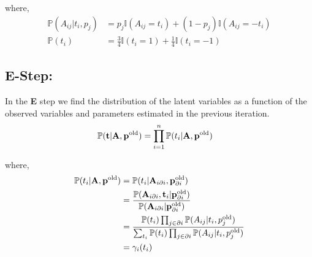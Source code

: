 \documentclass[12pt,onecolumn,letterpaper]{article}
\begin{document}
\noindent
where,
\begin{align*}
\mathbb{P}(A_{ij}|t_i,p_j) &= p_j\mathbb{I}(A_{ij}=t_i)+(1-p_j)\mathbb{I}(A_{ij}=-t_i) \\
\mathbb{P}(t_i) &= 
\frac{3}{4}\mathbb{I}(t_i=1)+\frac{1}{4}\mathbb{I}(t_i=-1)
\end{align*}

\subsection*{E-Step:}
In the \textbf{E} step we find the distribution of the latent variables as a function of the observed variables and parameters estimated in the previous iteration.
\begin{align*}
\mathbb{P}(\textbf{t}|\textbf{A},\textbf{p}^{{\rm old}}) &= 
\prod_{i=1}^{n} \mathbb{P}(t_i|\textbf{A},\textbf{p}^{{\rm old}})
\end{align*}

\noindent
where,
\begin{align*}
\mathbb{P}(t_i|\textbf{A},\textbf{p}^{{\rm old}}) &=
\mathbb{P}(t_i|\textbf{A}_{i\partial i},\textbf{p}_{\partial i}^{{\rm old}}) \\
&= 
\frac{
\mathbb{P}(\textbf{A}_{i\partial i},\textbf{t}_i|\textbf{p}_{\partial i}^{{\rm old}})
} 	
{
\mathbb{P}(\textbf{A}_{i\partial i}|\textbf{p}_{\partial i}^{{\rm old}})
} \\
&=
\frac{
\mathbb{P}(t_i)\prod_{j\in \partial i} \mathbb{P}(A_{ij}|t_i,p_j^{{\rm old}})
}
{
\sum_{t_i} \mathbb{P}(t_i)\prod_{j\in \partial i} \mathbb{P}(A_{ij}|t_i,p_j^{{\rm old}})
} \\
&= \gamma_i(t_i)
\end{align*}
\end{document}
